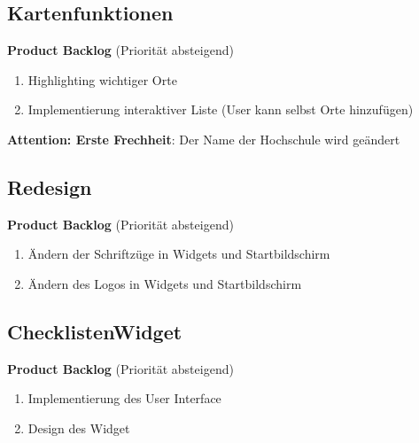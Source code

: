 \documentclass[12pt]{scrartcl}
\begin{document}
\subsection{Kartenfunktionen}
\textbf{Product Backlog} (Priorität absteigend)
\begin{enumerate}
\item Highlighting wichtiger Orte
\item Implementierung interaktiver Liste (User kann selbst Orte hinzufügen)
\end{enumerate}
\textbf{Attention: Erste Frechheit}: Der Name der Hochschule wird geändert
\subsection{Redesign}
\textbf{Product Backlog} (Priorität absteigend)
\begin{enumerate}
\item Ändern der Schriftzüge in Widgets und Startbildschirm
\item Ändern des Logos in Widgets und Startbildschirm
\end{enumerate}
\subsection{ChecklistenWidget}
\textbf{Product Backlog} (Priorität absteigend)
\begin{enumerate}
\item Implementierung des User Interface
\item Design des Widget
\end{enumerate}
\end{document}
